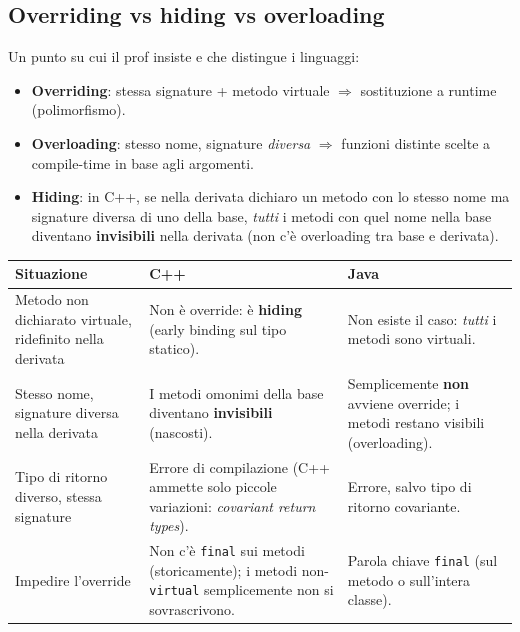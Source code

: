 \documentclass{report}
\newcommand{\code}[1]{\texttt{\small #1}}
\begin{document}
\subsection{Overriding vs hiding vs overloading}

Un punto su cui il prof insiste e che distingue i linguaggi:

\begin{itemize}
    \item \textbf{Overriding}: stessa signature + metodo virtuale $\Rightarrow$
    sostituzione a runtime (polimorfismo).
    \item \textbf{Overloading}: stesso nome, signature \emph{diversa}
    $\Rightarrow$ funzioni distinte scelte a compile-time in base agli
    argomenti.
    \item \textbf{Hiding}: in C++, se nella derivata dichiaro un metodo con lo
    stesso nome ma signature diversa di uno della base, \emph{tutti} i metodi
    con quel nome nella base diventano \textbf{invisibili} nella derivata (non
    c'è overloading tra base e derivata).
\end{itemize}

\begin{center}
\renewcommand{\arraystretch}{1.35}
\footnotesize
\begin{tabular}{|>{\raggedright\arraybackslash}p{3.2cm}|>{\raggedright\arraybackslash}p{4.2cm}|>{\raggedright\arraybackslash}p{4.6cm}|}
\hline
\textbf{Situazione} & \textbf{C++} & \textbf{Java} \\
\hline
Metodo non dichiarato virtuale, ridefinito nella derivata &
Non è override: è \textbf{hiding} (early binding sul tipo statico). &
Non esiste il caso: \emph{tutti} i metodi sono virtuali. \\
\hline
Stesso nome, signature diversa nella derivata &
I metodi omonimi della base diventano \textbf{invisibili} (nascosti). &
Semplicemente \textbf{non} avviene override; i metodi restano visibili
(overloading). \\
\hline
Tipo di ritorno diverso, stessa signature &
Errore di compilazione (C++ ammette solo piccole variazioni:
\emph{covariant return types}). &
Errore, salvo tipo di ritorno covariante. \\
\hline
Impedire l'override & Non c'è \code{final} sui metodi (storicamente);
i metodi non-\code{virtual} semplicemente non si sovrascrivono. &
Parola chiave \code{final} (sul metodo o sull'intera classe). \\
\hline
\end{tabular}
\end{center}
\end{document}
